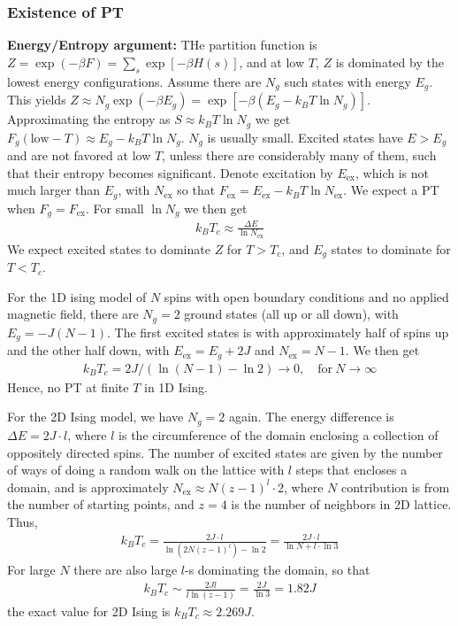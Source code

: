 \documentclass[a4paper, english, 12pt]{article}
\begin{document}
\begin{multicols*}{2}
\subsubsection*{\tiny Existence of PT} 

\textbf{Energy/Entropy argument:} THe partition function is $Z=\exp(-\beta F)=\sum_s \exp[-\beta H(s)]$, and at low $T$, $Z$ is dominated by the lowest energy configurations. Assume there are $N_g$ such states with energy $E_g$. This yields $Z\approx N_g \exp(-\beta E_g)=\exp[-\beta(E_g - k_B T \ln N_g)]$. Approximating the entropy as $S\approx k_B T \ln N_g$ we get $F_g(\text{low}-T)\approx E_g - k_B T \ln N_g$. $N_g$ is usually small. Excited states have $E>E_g$ and are not favored at low $T$, unless there are considerably many of them, such that their entropy becomes significant. Denote excitation by $E_{\mathrm{ex}}$, which is not much larger than $E_g$, with $N_\mathrm{ex}$ so that $F_\mathrm{ex}=E_\mathrm{ex}-k_B T \ln N_\mathrm{ex}$. We expect a PT when $F_g=F_\mathrm{ex}$. For small $\ln N_g$ we then get 
\begin{align*}
    k_B T_c \approx \frac{\Delta E}{\ln N_\mathrm{ex}}
\end{align*} 
We expect excited states to dominate $Z$ for $T>T_c$, and $E_g$ states to dominate for $T<T_c$. 

For the 1D ising model of $N$ spins with open boundary conditions and no applied magnetic field, there are $N_g=2$ ground states (all up or all down), with $E_g=-J(N-1)$. The first excited states is with approximately half of spins up and the other half down, with $E_\mathrm{ex}=E_g+2J$ and $N_\mathrm{ex}=N-1$. We then get 
\begin{align*}
    k_B T_c = 2J/(\ln(N-1)-\ln 2) \to 0,\quad\text{for}\: N\to\infty
\end{align*}
Hence, no PT at finite $T$ in 1D Ising. 

For the 2D Ising model, we have $N_g=2$ again. The energy difference is $\Delta E=2J\cdot l$, where $l$ is the circumference of the domain enclosing a collection of oppositely directed spins. The number of excited states are given by the number of ways of doing a random walk on the lattice with $l$ steps that encloses a domain, and is approximately $N_\mathrm{ex}\approx N(z-1)^l \cdot 2$, where $N$ contribution is from the number of starting points, and $z=4$ is the number of neighbors in 2D lattice. Thus,
\begin{align*}
    k_B T_c = \frac{2J\cdot l}{\ln(2N(z-1)^l)-\ln2} = \frac{2J \cdot l}{\ln N + l\cdot \ln3}
\end{align*}
For large $N$ there are also large $l$-s dominating the domain, so that 
\begin{align*}
    k_B T_c\sim \frac{2Jl}{l\ln(z-1)}=\frac{2J}{\ln3}=1.82 J
\end{align*}
the exact value for 2D Ising is $k_B T_c\approx 2.269J$.


\end{multicols*}
\end{document}
